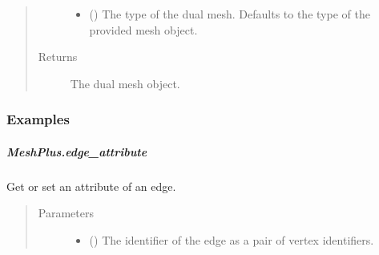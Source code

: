 \documentclass[letterpaper,10pt,english]{sphinxmanual}
\begin{document}
\begin{fulllineitems}
\begin{fulllineitems}
\begin{quote}
\begin{description}
\begin{itemize}
\item {} 
 () \textendash{} The type of the dual mesh.
Defaults to the type of the provided mesh object.

\end{itemize}

\item[{Returns}] \leavevmode
{} \textendash{} The dual mesh object.

\end{description}\end{quote}
\subsubsection*{Examples}

\begin{sphinxVerbatim}[commandchars=\\\{\}]
\end{sphinxVerbatim}

\end{fulllineitems}



\subparagraph{MeshPlus.edge\_attribute}
\label{\detokenize{api/generated/directional_clustering.mesh.MeshPlus.edge_attribute:meshplus-edge-attribute}}\label{\detokenize{api/generated/directional_clustering.mesh.MeshPlus.edge_attribute::doc}}

\begin{fulllineitems}
\label{\detokenize{api/generated/directional_clustering.mesh.MeshPlus.edge_attribute:directional_clustering.mesh.MeshPlus.edge_attribute}}
Get or set an attribute of an edge.
\begin{quote}\begin{description}
\item[{Parameters}] \leavevmode\begin{itemize}
\item {} 
 () \textendash{} The identifier of the edge as a pair of vertex identifiers.


\end{itemize}
\end{description}
\end{quote}
\end{fulllineitems}
\end{fulllineitems}
\end{document}
